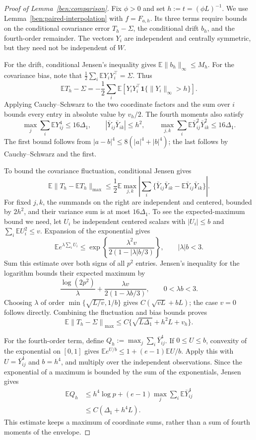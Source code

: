 \documentclass[11pt,letterpaper]{article}
\theoremstyle{remark}
\newcommand{\E}{\mathbb E}
\newcommand{\norm}[1]{\left\lVert#1\right\rVert}
\newcommand{\maxnorm}[1]{\lVert#1\rVert_{\max}}
\newcommand{\ind}{\mathbf 1}
\begin{document}
\begin{proof}[Proof of Lemma~\ref{ben:comparison}]
Fix $\phi>0$ and set $h:=t=(\phi L)^{-1}$. We use
Lemma~\ref{ben:paired-interpolation} with $f=F_{a,h}$. Its three
terms require bounds on the conditional covariance error
$T_h-\Sigma$, the conditional drift $b_h$, and the fourth-order
remainder. The vectors $Y_i$ are independent and centrally
symmetric, but they need not be independent of $W$.

For the drift, conditional Jensen's inequality gives
$\E\|b_h\|_\infty\le M_h$. For the covariance bias, note that
$\tfrac12\sum_i\E Y_iY_i^\top=\Sigma$. Thus
\[
 \E T_h-\Sigma
 =-\frac12\sum_i\E[Y_iY_i^\top\ind\{\|Y_i\|_\infty>h\}].
\]
Applying Cauchy--Schwarz to the two coordinate factors and the sum
over $i$ bounds every entry in absolute value by $v_h/2$.
The fourth moments also satisfy
\[
 \max_j\sum_i\E Y_{ij}^4\le16\Delta_1,\qquad
 |\bar Y_{ij}\bar Y_{ik}|\le h^2,\qquad
 \max_{j,k}\sum_i\E\bar Y_{ij}^2\bar Y_{ik}^2\le16\Delta_1.
\]
The first bound follows from $|a-b|^4\le8(|a|^4+|b|^4)$;
the last follows by Cauchy--Schwarz and the first.

To bound the covariance fluctuation, conditional Jensen gives
\[
 \E\maxnorm{T_h-\E T_h}
 \le\frac12\E\max_{j,k}\left|
   \sum_i\{\bar Y_{ij}\bar Y_{ik}
                    -\E\bar Y_{ij}\bar Y_{ik}\}\right|.
\]
For fixed $j,k$, the summands on the right are independent and
centered, bounded by $2h^2$, and their variance sum is at most
$16\Delta_1$. To see the expected-maximum bound we need, let
$U_i$ be independent centered scalars with $|U_i|\le b$ and
$\sum_i\E U_i^2\le v$. Expansion of the exponential gives
\[
 \E e^{\lambda\sum_iU_i}
 \le\exp\!\left\{\frac{\lambda^2v}{2(1-|\lambda|b/3)}\right\},
 \qquad |\lambda|b<3.
\]
Sum this estimate over both signs of all $p^2$ entries. Jensen's
inequality for the logarithm bounds their expected maximum by
\[
 \frac{\log(2p^2)}{\lambda}
       +\frac{\lambda v}{2(1-\lambda b/3)},\qquad 0<\lambda b<3.
\]
Choosing $\lambda$ of order
$\min\{\sqrt{L/v},1/b\}$ gives $C(\sqrt{vL}+bL)$;
the case $v=0$ follows directly. Combining the fluctuation and
bias bounds proves
\begin{equation}\label{ben:conditional-matrix}
 \E\norm{T_h-\Sigma}_{\max}
 \le C\{\sqrt{L\Delta_1}+h^2L+v_h\}.
\end{equation}

For the fourth-order term, define
$Q_h:=\max_j\sum_i\bar Y_{ij}^4$.
If $0\le U\le b$, convexity of the exponential on $[0,1]$ gives
$\E e^{U/b}\le1+(e-1)\E U/b$.
Apply this with $U=\bar Y_{ij}^4$ and $b=h^4$, and multiply
over the independent observations. Since the exponential of a
maximum is bounded by the sum of the exponentials, Jensen gives
\begin{equation}\label{ben:fourth-maximum}
 \begin{split}
 \E Q_h
 &\le h^4\log p+(e-1)\max_j\sum_i\E\bar Y_{ij}^4\\
 &\le C(\Delta_1+h^4L).
 \end{split}
\end{equation}
This estimate keeps a maximum of coordinate sums, rather than a
sum of fourth moments of the envelope.


\end{proof}
\end{document}
